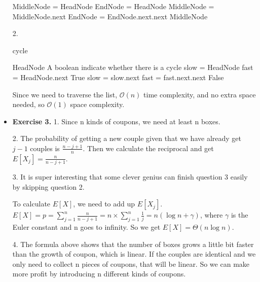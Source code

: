 \documentclass{article}
\newcommand{\bigO}{\mathcal{O}}
\begin{document}
\begin{itemize}
\begin{algorithm}[H]
\begin{algorithmic}[1]
        \State MiddleNode = HeadNode
        \State EndNode = HeadNode
            \State MiddleNode = MiddleNode.next
            \State EndNode = EndNode.next.next
        \EndWhile
        \Return MiddleNode
        
    \end{algorithmic}  
\end{algorithm}

2.
\begin{algorithm}[H]  
    \caption{cycle}  
    \begin{algorithmic}[1]  
        \Require HeadNode
        \Ensure A boolean indicate whether there is a cycle
        \State slow = HeadNode
        \State fast = HeadNode.next
                \State \Return True
            \EndIf
            \State slow = slow.next
            \State fast = fast.next.next
        \EndWhile
        \State \Return False

    \end{algorithmic}  
\end{algorithm}
Since we need to traverse the list, $\bigO (n)$ time complexity, and no extra space needed, so $\bigO (1)$ space complexity.

\item \textbf{Exercise 3.}
1. Since n kinds of coupons, we need at least n boxes.

2. The probability of getting a new couple given that we have already get $j-1$ couples is $\frac{n-j+1}{n}$. Then we calculate the reciprocal and get $E\left[X_{j}\right] = \frac{n}{n-j+1}$.

3. It is super interesting that some clever genius can finish question 3 easily by skipping question 2.

To calculate $E\left[X\right]$, we need to add up $E\left[X_{j}\right]$. $E\left[X\right] = p = \sum_{j=1}^n \frac{n}{n-j+1} = n\times \sum_{j=1}^n \frac{1}{j} = n(\log n + \gamma)$, where $\gamma$ is the Euler constant and n goes to infinity. So we get $E\left[X\right] = \Theta (n\log n)$.

4. The formula above shows that the number of boxes grows a little bit faster than the growth of coupon, which is linear. If the couples are identical and we only need to collect n pieces of coupons, that will be linear. So we can make more profit by introducing n different kinds of coupons.







\end{itemize}

\end{document}
